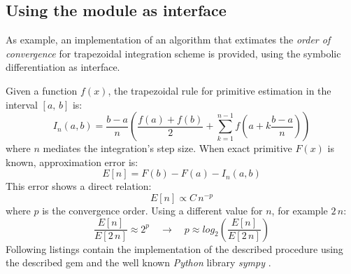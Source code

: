 \subsection{Using the module as interface}
As example, an implementation of an algorithm that extimates the \emph{order of convergence} for trapezoidal integration scheme \cite{weideman2002numerical} is provided, using the symbolic differentiation as interface.

Given a function $f(x)$, the trapezoidal rule for primitive estimation in the interval $[a,\,b]$ is:
\begin{equation}
  I_{n}(a, b) = \dfrac{b - a}{n} \left( \dfrac{f(a) + f(b)}{2} +
    \sum\limits_{k = 1}^{n - 1}{f \left( a + k \dfrac{b - a}{n} \right)} \right)
\end{equation}
where $n$ mediates the integration's step size. When exact primitive $F(x)$ is known, approximation error is:
\begin{equation}
  E[n] = F(b) - F(a) - I_{n}(a, b)
\end{equation}
This error shows a direct relation:
\begin{equation}
  E[n] \propto C\,{n}^{-p}
\end{equation}
where $p$ is the convergence order. Using a different value for $n$, for example $2\,n$:
\begin{equation}
  \dfrac{E[n]}{E[2\,n]} \approx 2^{p} \quad \rightarrow \quad p \approx log_2 \left( \dfrac{E[n]}{E[2\,n]} \right)
\end{equation}
Following listings contain the implementation of the described procedure using the described gem and the well known \emph{Python} \cite{van2011python} library \emph{sympy} \cite{christopher_smith_2016_47274}.

\noindent%
  \begin{minipage}{.5\textwidth}
    
  \end{minipage}\hfill
  \begin{minipage}{.5\textwidth}
    
  \end{minipage}

